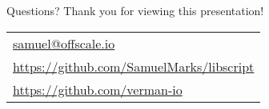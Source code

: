 \documentclass[aspectratio=169]{beamer}
\begin{document}
\begin{frame}{Questions?}
    \centering
  Thank you for viewing this presentation!

  \vspace{2em}
  \centering
  \begin{center}
    \begin{tabular}{l}
        \href{mailto:samuel@offscale.io}{samuel@offscale.io}\\
        \href{https://github.com/SamuelMarks/libscript}{https://github.com/SamuelMarks/libscript}\\
        \href{https://github.com/verman-io}{https://github.com/verman-io}
    \end{tabular}
  \end{center}
  
\end{frame}





\end{document}
